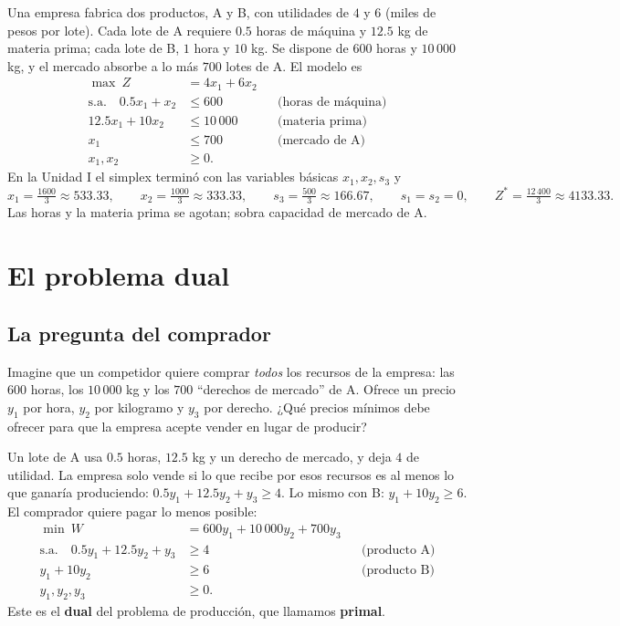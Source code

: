 \documentclass[a4paper,11pt]{article}
\theoremstyle{plain}
\theoremstyle{definition}
\newcommand{\fr}[2]{\tfrac{#1}{#2}}
\begin{document}
Una empresa fabrica dos productos, A y B, con utilidades de $4$ y $6$ (miles de pesos por lote). Cada lote
de A requiere $0.5$ horas de máquina y $12.5$ kg de materia prima; cada lote de B, $1$ hora y $10$ kg. Se
dispone de $600$ horas y $10\,000$ kg, y el mercado absorbe a lo más $700$ lotes de A. El modelo es
\[
\begin{aligned}
\max\ Z&=4x_1+6x_2\\
\text{s.a.}\quad 0.5x_1+x_2&\le600 &&\text{(horas de máquina)}\\
12.5x_1+10x_2&\le10\,000 &&\text{(materia prima)}\\
x_1&\le700 &&\text{(mercado de A)}\\
x_1,x_2&\ge0.
\end{aligned}
\]
En la Unidad I el simplex terminó con las variables básicas $x_1,x_2,s_3$ y
\[
x_1=\fr{1600}{3}\approx533.33,\qquad x_2=\fr{1000}{3}\approx333.33,\qquad s_3=\fr{500}{3}\approx166.67,
\qquad s_1=s_2=0,\qquad Z^*=\fr{12\,400}{3}\approx4133.33.
\]
Las horas y la materia prima se agotan; sobra capacidad de mercado de A.

\section{El problema dual}

\subsection{La pregunta del comprador}
Imagine que un competidor quiere comprar \emph{todos} los recursos de la empresa: las $600$ horas, los
$10\,000$ kg y los $700$ ``derechos de mercado'' de A. Ofrece un precio $y_1$ por hora, $y_2$ por kilogramo y
$y_3$ por derecho. ¿Qué precios mínimos debe ofrecer para que la empresa acepte vender en lugar de
producir?

Un lote de A usa $0.5$ horas, $12.5$ kg y un derecho de mercado, y deja $4$ de utilidad. La empresa solo
vende si lo que recibe por esos recursos es al menos lo que ganaría produciendo:
$0.5y_1+12.5y_2+y_3\ge4$. Lo mismo con B: $y_1+10y_2\ge6$. El comprador quiere pagar lo menos posible:
\[
\begin{aligned}
\min\ W&=600y_1+10\,000y_2+700y_3\\
\text{s.a.}\quad 0.5y_1+12.5y_2+y_3&\ge4 &&\text{(producto A)}\\
y_1+10y_2&\ge6 &&\text{(producto B)}\\
y_1,y_2,y_3&\ge0.
\end{aligned}
\]
Este es el \textbf{dual} del problema de producción, que llamamos \textbf{primal}.
\end{document}
